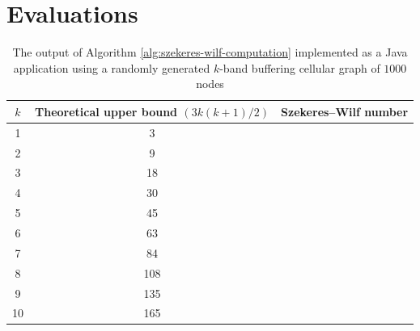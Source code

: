 \documentclass[a4paper, 12pt]{article}
\begin{document}
\section{Evaluations}\label{sec:eval}
\begin{table}[h!]
\centering
\begin{tabular}{|c|c|c|}
\hline
 $k$& Theoretical upper bound $(3k(k+1)/2)$ & Szekeres\---Wilf number \\ \hline
 1&  3&   \\ \hline
 2&  9&  \\ \hline
 3&  18&  \\ \hline
 4&  30&  \\ \hline
 5&  45&  \\ \hline
 6&  63&  \\ \hline
 7&  84&  \\ \hline
 8&  108&  \\ \hline
 9&  135&  \\ \hline
 10&  165&  \\ \hline
\end{tabular}
\label{table:eval}
\caption{The output of Algorithm \ref{alg:szekeres-wilf-computation} implemented as a Java application using a randomly generated $k$-band buffering cellular graph of $1000$ nodes}
\end{table}
\newpage
\printbibliography
{}
\end{document}

